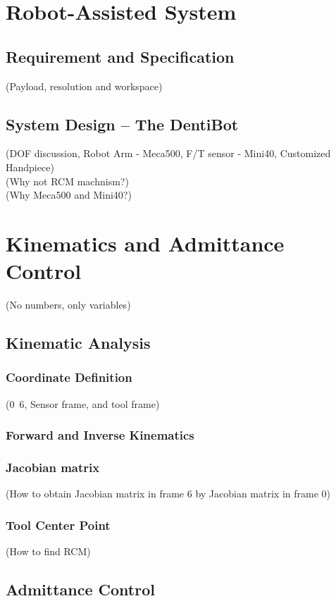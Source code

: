 \documentclass[12pt]{report}
\begin{document}
\begin{CJK}{UTF8}{bsmi}
\chapter{Robot-Assisted System}
\section{Requirement and Specification}
(Payload, resolution and workspace)
\section{System Design – The DentiBot}
(DOF discussion, Robot Arm - Meca500, F/T sensor - Mini40, Customized Handpiece)\\
(Why not RCM machnism?)\\
(Why Meca500 and Mini40?)\\
\chapter{Kinematics and Admittance Control}
(No numbers, only variables)\\
\section{Kinematic Analysis}
\subsection{Coordinate Definition}
(0~6, Sensor frame, and tool frame)\\
\subsection{Forward and Inverse Kinematics}
\subsection{Jacobian matrix}
(How to obtain Jacobian matrix in frame 6 by Jacobian matrix in frame 0)\\
\subsection{Tool Center Point}
(How to find RCM)\\
\section{Admittance Control}

\end{CJK}
\end{document}
